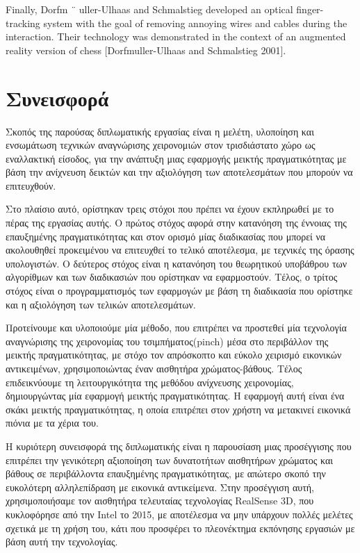 Finally, Dorfm ¨ uller-Ulhaas and Schmalstieg developed an optical finger-tracking system with the goal of removing annoying wires and cables during the interaction. Their technology was demonstrated in the context of an augmented reality version of chess [Dorfmuller-Ulhaas and Schmalstieg 2001].


\section{Συνεισφορά}

Σκοπός της παρούσας διπλωματικής εργασίας είναι η μελέτη, υλοποίηση και ενσωμάτωση τεχνικών αναγνώρισης χειρονομιών στον τρισδιάστατο χώρο ως εναλλακτική είσοδος, για την ανάπτυξη μιας εφαρμογής μεικτής πραγματικότητας με βάση την ανίχνευση δεικτών και την αξιολόγηση των αποτελεσμάτων που μπορούν να επιτευχθούν. 

Στο πλαίσιο αυτό, ορίστηκαν τρεις στόχοι που πρέπει να έχουν εκπληρωθεί με το πέρας της εργασίας αυτής. Ο πρώτος στόχος αφορά στην κατανόηση της έννοιας της επαυξημένης πραγματικότητας και στον ορισμό μίας διαδικασίας που μπορεί να ακολουθηθεί προκειμένου να επιτευχθεί το τελικό αποτέλεσμα, με τεχνικές της όρασης υπολογιστών. Ο δεύτερος στόχος είναι η κατανόηση του θεωρητικού υποβάθρου των αλγορίθμων και των διαδικασιών που ορίστηκαν να εφαρμοστούν. Τέλος, ο τρίτος στόχος είναι ο προγραμματισμός των εφαρμογών με βάση τη διαδικασία που ορίστηκε και η αξιολόγηση των τελικών αποτελεσμάτων.


Προτείνουμε και υλοποιούμε μία μέθοδο, που επιτρέπει να προστεθεί μία τεχνολογία αναγνώρισης της χειρονομίας του τσιμπήματος(pinch) μέσα στο περιβάλλον της μεικτής πραγματικότητας, με στόχο τον απρόσκοπτο και εύκολο χειρισμό εικονικών αντικειμένων, χρησιμοποιώντας έναν αισθητήρα χρώματος-βάθους.
Τέλος επιδεικνύουμε τη λειτουργικότητα της μεθόδου ανίχνευσης χειρονομίας, δημιουργώντας μία εφαρμογή μεικτής πραγματικότητας. Η εφαρμογή αυτή είναι ένα σκάκι μεικτής πραγματικότητας, η οποία επιτρέπει στον χρήστη να μετακινεί εικονικά πιόνια με τα χέρια του.

Η κυριότερη συνεισφορά της διπλωματικής είναι η παρουσίαση μιας προσέγγισης που επιτρέπει την γενικότερη αξιοποίηση των δυνατοτήτων αισθητήρων χρώματος και βάθους σε περιβάλλοντα επαυξημένης πραγματικότητας, με απώτερο σκοπό την ευκολότερη αλληλεπίδραση με εικονικά αντικείμενα.
Στην προσέγγιση αυτή, χρησιμοποιήσαμε τον αισθητήρα τελευταίας τεχνολογίας RealSense 3D, που κυκλοφόρησε από την Intel το 2015, με αποτέλεσμα να μην υπάρχουν πολλές μελέτες σχετικά με τη χρήση του, κάτι που προσφέρει το πλεονέκτημα εκπόνησης εργασιών με βάση αυτή την τεχνολογίας.

